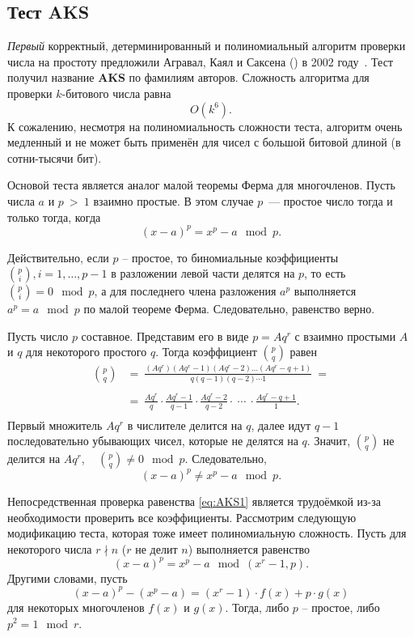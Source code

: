 \subsection{Тест AKS}\label{section-prime-check-aks}

\emph{Первый} корректный, детерминированный и полиномиальный алгоритм проверки числа на простоту предложили Агравал, Каял и Саксена () в 2002 году~\cite{aks:2002}. Тест получил название \textbf{AKS} по фамилиям авторов. Сложность алгоритма для проверки $k$-битового числа равна
    \[ O(k^{6}). \]
К сожалению, несмотря на полиномиальность сложности теста, алгоритм очень медленный и не может быть применён для чисел с большой битовой длиной (в сотни-тысячи бит).

Основой теста является аналог малой теоремы Ферма для многочленов. Пусть числа $a$ и $p~>~1$ взаимно простые. В этом случае $p$~--- простое число тогда и только тогда, когда
\begin{equation}
    \label{eq:AKS1}
    (x - a)^p = x^p - a \mod p.
\end{equation}

Действительно, если $p$ -- простое, то биномиальные коэффициенты $\binom{p}{i}, i = 1, \dots, p-1$ в разложении левой части делятся на $p$, то есть ~ $\binom{p}{i} = 0 \mod p$, а для последнего члена разложения $a^p$ выполняется $a^p = a \mod p$ по малой теореме Ферма. Следовательно, равенство верно.

Пусть число $p$ составное. Представим его в виде $p = A q^r$ с взаимно простыми $A$ и $q$ для некоторого простого $q$. Тогда коэффициент $\binom{p}{q}$ равен
\[\begin{array}{rl}
    \binom{p}{q} & =~ \frac{(A q^r) (A q^r - 1)(A q^r - 2) \dots (A q^r - q + 1)}{q (q-1)(q-2) \cdots 1} ~= \\
    & \\
    & =~ \frac{A q^r}{q} \cdot \frac{A q^r - 1}{q-1} \cdot \frac{A q^r - 2}{q-2} \cdot ~\cdots~ \cdot \frac{A q^r - q + 1}{1}. \\
\end{array} \]
Первый множитель $A q^r$ в числителе делится на $q$, далее идут \mbox{$q-1$} последовательно убывающих чисел, которые не делятся на $q$. Значит, $\binom{p}{q}$ не делится на $A q^r$, ~ $\binom{p}{q} \neq 0 \mod p$. Следовательно,
\[
(x - a)^p \neq x^p - a \mod p.
\]

Непосредственная проверка равенства \eqref{eq:AKS1} является трудоёмкой из-за необходимости проверить все коэффициенты. Рассмотрим следующую модификацию теста, которая тоже имеет полиномиальную сложность. Пусть для некоторого числа $r \nmid n$ ($r$ не делит $n$) выполняется равенство
\begin{equation}
    \label{eq:AKS2}
    (x - a)^p = x^p - a \mod (x^r-1, p).
\end{equation}
Другими словами, пусть
    \[ (x - a)^p - (x^p - a) = (x^r-1) \cdot f(x) + p \cdot g(x) \]
для некоторых многочленов $f(x)$ и $g(x)$. Тогда, либо $p$ -- простое, либо $p^2 = 1 \mod r$.


